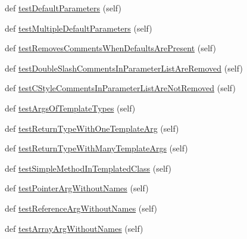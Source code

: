 \begin{DoxyCompactItemize}
def \mbox{\hyperlink{classscripts_1_1generator_1_1cpp_1_1gmock__class__test_1_1_generate_methods_test_aa466ed5df6c18221b2b35797edd9f573}{test\+Default\+Parameters}} (self)
\item 
def \mbox{\hyperlink{classscripts_1_1generator_1_1cpp_1_1gmock__class__test_1_1_generate_methods_test_a1db9c4f03a9c873ac5a0d38900a0c5b7}{test\+Multiple\+Default\+Parameters}} (self)
\item 
def \mbox{\hyperlink{classscripts_1_1generator_1_1cpp_1_1gmock__class__test_1_1_generate_methods_test_a4adc8cb69ea36ff0ef99dfc4a4ab8894}{test\+Removes\+Comments\+When\+Defaults\+Are\+Present}} (self)
\item 
def \mbox{\hyperlink{classscripts_1_1generator_1_1cpp_1_1gmock__class__test_1_1_generate_methods_test_aced2c3b151eaf01c9fceaf1096932bd1}{test\+Double\+Slash\+Comments\+In\+Parameter\+List\+Are\+Removed}} (self)
\item 
def \mbox{\hyperlink{classscripts_1_1generator_1_1cpp_1_1gmock__class__test_1_1_generate_methods_test_aa3c77e8b1351f720b2bec41491836b4a}{test\+C\+Style\+Comments\+In\+Parameter\+List\+Are\+Not\+Removed}} (self)
\item 
def \mbox{\hyperlink{classscripts_1_1generator_1_1cpp_1_1gmock__class__test_1_1_generate_methods_test_ab711b48d5edae0c965896601f8ee1cc0}{test\+Args\+Of\+Template\+Types}} (self)
\item 
def \mbox{\hyperlink{classscripts_1_1generator_1_1cpp_1_1gmock__class__test_1_1_generate_methods_test_a572609ead01536fdabe319989bebe069}{test\+Return\+Type\+With\+One\+Template\+Arg}} (self)
\item 
def \mbox{\hyperlink{classscripts_1_1generator_1_1cpp_1_1gmock__class__test_1_1_generate_methods_test_aae37995741a5ec94fa25129666f390bf}{test\+Return\+Type\+With\+Many\+Template\+Args}} (self)
\item 
def \mbox{\hyperlink{classscripts_1_1generator_1_1cpp_1_1gmock__class__test_1_1_generate_methods_test_aa03ba201b184507a3c2dce8dc380e9c2}{test\+Simple\+Method\+In\+Templated\+Class}} (self)
\item 
def \mbox{\hyperlink{classscripts_1_1generator_1_1cpp_1_1gmock__class__test_1_1_generate_methods_test_a03962cc87f8a5695c46360524b9e151e}{test\+Pointer\+Arg\+Without\+Names}} (self)
\item 
def \mbox{\hyperlink{classscripts_1_1generator_1_1cpp_1_1gmock__class__test_1_1_generate_methods_test_a9ffe6eb21d6d9fa2633ab01cf8ad8226}{test\+Reference\+Arg\+Without\+Names}} (self)
\item 
def \mbox{\hyperlink{classscripts_1_1generator_1_1cpp_1_1gmock__class__test_1_1_generate_methods_test_a0a50b903d779bc50b758c591418a3ae9}{test\+Array\+Arg\+Without\+Names}} (self)
\end{DoxyCompactItemize}


